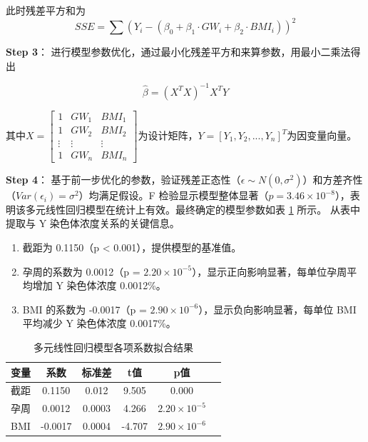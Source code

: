 \documentclass[withoutpreface,bwprint]{cumcmthesis} %
\begin{document}
此时残差平方和为
\begin{equation}
    SSE = \sum (Y_i - (\beta_0 + \beta_1 \cdot GW_i + \beta_2 \cdot BMI_i))^2
\end{equation}

\textbf{Step 3}：
进行模型参数优化，通过最小化残差平方和来算参数，用最小二乘法得出

\begin{equation}
    \hat{\beta} = (X^TX)^{-1}X^TY
\end{equation}

其中$X = \begin{bmatrix} 1 & GW_1 & BMI_1 \\ 1 & GW_2 & BMI_2 \\ \vdots & \vdots & \vdots \\ 1 & GW_n & BMI_n \end{bmatrix}$为设计矩阵，$Y = [Y_1, Y_2, ..., Y_n]^T$为因变量向量。  

\textbf{Step 4}：
基于前一步优化的参数，验证残差正态性（$\epsilon \sim N(0, \sigma^2)$）和方差齐性（$Var(\epsilon_i) = \sigma^2$）均满足假设。F 检验显示模型整体显著（$p=3.46 \times 10^{-8}$），表明该多元线性回归模型在统计上有效。最终确定的模型参数如表 \ref{tab:多元线性回归模型各项系数拟合结果} 所示。
从表中提取与 Y 染色体浓度关系的关键信息。
\begin{enumerate}
    \item 截距为 0.1150（p < 0.001），提供模型的基准值。
    \item 孕周的系数为 0.0012（p = $2.20 \times 10^{-5}$），显示正向影响显著，每单位孕周平均增加 Y 染色体浓度 0.0012\%。
    \item BMI 的系数为 -0.0017（p = $2.90 \times 10^{-6}$），显示负向影响显著，每单位 BMI 平均减少 Y 染色体浓度 0.0017\%。
\end{enumerate}

\begin{table}[H]
    \centering
    \caption{多元线性回归模型各项系数拟合结果}
    \label{tab:多元线性回归模型各项系数拟合结果}
    \begin{threeparttable}
        \begin{tabularx}{0.55\textwidth}{l c c c c c}
            \toprule[1.5pt]
            \textbf{变量} & \textbf{系数} & \textbf{标准差} & \textbf{t值} & \textbf{p值}\\
            \midrule[1pt]
            截距 & 0.1150 & 0.012 & 9.505 & 0.000  \\
            孕周 & 0.0012 & 0.0003 & 4.266 & $2.20 \times 10^{-5}$  \\
            BMI  & -0.0017 & 0.0004  & -4.707 & $2.90 \times 10^{-6}$  \\
            \bottomrule[1.5pt]
        \end{tabularx}
    \end{threeparttable}
\end{table}
\end{document}
